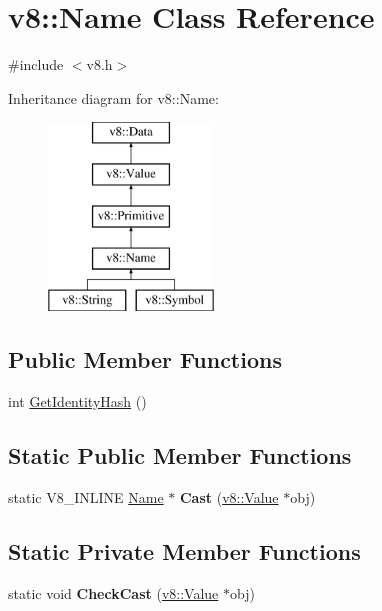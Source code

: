 \hypertarget{classv8_1_1_name}{}\section{v8\+:\+:Name Class Reference}
\label{classv8_1_1_name}


{\ttfamily \#include $<$v8.\+h$>$}

Inheritance diagram for v8\+:\+:Name\+:\begin{figure}[H]
\begin{center}
\leavevmode
\includegraphics[height=5.000000cm]{classv8_1_1_name}
\end{center}
\end{figure}
\subsection*{Public Member Functions}
\begin{DoxyCompactItemize}
\item 
int \hyperlink{classv8_1_1_name_aef60fce47685fad12914304f6bc52bf2}{Get\+Identity\+Hash} ()
\end{DoxyCompactItemize}
\subsection*{Static Public Member Functions}
\begin{DoxyCompactItemize}
\item 
static V8\+\_\+\+I\+N\+L\+I\+NE \hyperlink{classv8_1_1_name}{Name} $\ast$ {\bfseries Cast} (\hyperlink{classv8_1_1_value}{v8\+::\+Value} $\ast$obj)\hypertarget{classv8_1_1_name_a8291aa8958f5dfb67d4415510f584ac4}{}\label{classv8_1_1_name_a8291aa8958f5dfb67d4415510f584ac4}

\end{DoxyCompactItemize}
\subsection*{Static Private Member Functions}
\begin{DoxyCompactItemize}
\item 
static void {\bfseries Check\+Cast} (\hyperlink{classv8_1_1_value}{v8\+::\+Value} $\ast$obj)\hypertarget{classv8_1_1_name_a9fbe24d05685553abbe386cf13219c08}{}\label{classv8_1_1_name_a9fbe24d05685553abbe386cf13219c08}

\end{DoxyCompactItemize}


